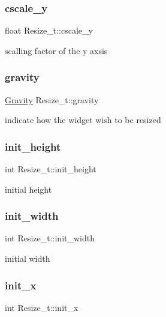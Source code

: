 \subsubsection{\texorpdfstring{cscale\+\_\+y}{cscale\_y}}
{\footnotesize\ttfamily float Resize\+\_\+t\+::cscale\+\_\+y}

scalling factor of the y axsis \mbox{\label{structResize__t_a20c3835bb7bf53474f4d54447ffcd191}} 
\subsubsection{\texorpdfstring{gravity}{gravity}}
{\footnotesize\ttfamily \hyperlink{xwidget_8h_a5b77df25933eae1169c9efbc78391ade}{Gravity} Resize\+\_\+t\+::gravity}

indicate how the widget wish to be resized \mbox{\label{structResize__t_ad3562783d29d76a51cb07dbeb7c6042e}} 
\subsubsection{\texorpdfstring{init\+\_\+height}{init\_height}}
{\footnotesize\ttfamily int Resize\+\_\+t\+::init\+\_\+height}

initial height \mbox{\label{structResize__t_ac2ac6971401bfef5bbfa578068fc65bb}} 
\subsubsection{\texorpdfstring{init\+\_\+width}{init\_width}}
{\footnotesize\ttfamily int Resize\+\_\+t\+::init\+\_\+width}

initial width \mbox{\label{structResize__t_aff15bb95322452215ca38c4f3c926cd1}} 
\subsubsection{\texorpdfstring{init\+\_\+x}{init\_x}}
{\footnotesize\ttfamily int Resize\+\_\+t\+::init\+\_\+x}

